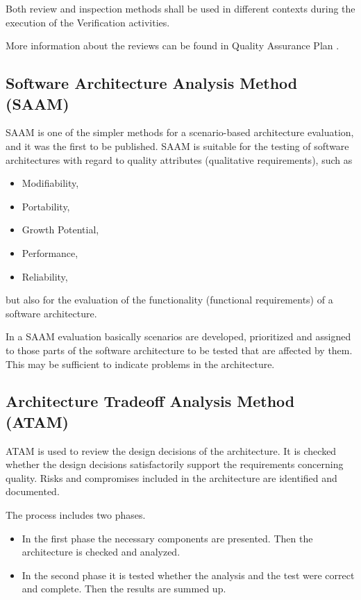 \documentclass{template/openetcs_report}
\begin{document}
Both review and inspection methods shall be used in different
contexts during the execution of the Verification activities.

More information about the reviews can be found in Quality Assurance Plan
\cite{QAPlan}.

\subsection{Software Architecture Analysis Method (SAAM)}

SAAM \cite{SAAM} is one of the simpler methods for a scenario-based architecture 
evaluation, and it was the first to be published. SAAM is suitable 
for the testing of software architectures with regard to quality 
attributes (qualitative requirements), such as
%
\begin{itemize}
\item Modifiability,
\item Portability,
\item Growth Potential,
\item Performance,
\item Reliability,
\end{itemize}
%
but also for the evaluation of the functionality (functional 
requirements) of a software architecture. 

In a SAAM evaluation basically scenarios are developed, 
prioritized and assigned to those parts of the software 
architecture to be tested that are affected by them. 
This may be sufficient to indicate problems in the architecture.

\subsection{Architecture Tradeoff Analysis Method (ATAM)}	
\label{sec:atam}

ATAM \cite{ATAM} is used to review the design decisions of the architecture. 
It is checked whether the design decisions satisfactorily 
support the requirements concerning quality. Risks and 
compromises included in the architecture are identified 
and documented.

The process includes two phases. 
\begin{itemize}
\item In the first phase the necessary components 
	are presented. Then the architecture is checked and analyzed. 
\item In the second phase it is tested whether the analysis 
	and the test were correct and complete. Then the 
	results are summed up.
\end{itemize}
\end{document}
